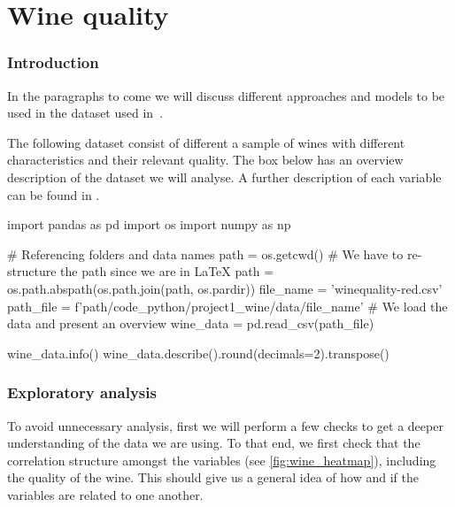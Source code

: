 \documentclass[11pt]{article}
\begin{document}


\tableofcontents\newpage

\part{Wine quality} \label{part:wine}

\section{Introduction}\label{sec:introduction}
In the paragraphs to come we will discuss different approaches and models to be used in the dataset used in~\cite{wine}.

The following dataset consist of different a sample of wines with different characteristics and their relevant
quality.
The box below has an overview description of the dataset we will analyse.
A further description of each variable can be found in .

\begin{pyconcode}
import pandas as pd
import os
import numpy as np

# Referencing folders and data names
path = os.getcwd()
# We have to re-structure the path since we are in LaTeX
path = os.path.abspath(os.path.join(path, os.pardir))
file_name = 'winequality-red.csv'
path_file = f'{path}/code_python/project1_wine/data/{file_name}'
# We load the data and present an overview
wine_data = pd.read_csv(path_file)
\end{pyconcode}

\begin{pyconsole}[][]
wine_data.info()
wine_data.describe().round(decimals=2).transpose()
\end{pyconsole}

\section{Exploratory analysis}\label{sec:exploratory-analysis}

To avoid unnecessary analysis, first we will perform a few checks to get a deeper understanding of the
data we are using.
To that end, we first check that the correlation structure amongst the variables (see \cref{fig:wine_heatmap}),
including the quality of the wine.
This should give us a general idea of how and if the variables are related to one another.
\end{document}
